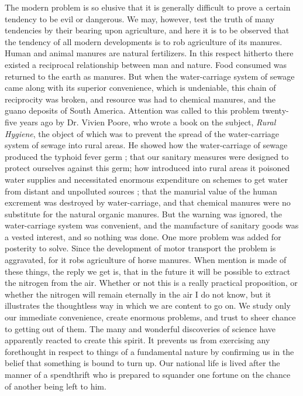 \documentclass{book}
\begin{document}
The modern problem is so elusive that it is generally difficult to prove a certain tendency to be evil or dangerous. We may, however, test the truth of many tendencies by their bearing upon agriculture, and here it is to be observed that the tendency of all modern developments is to rob agriculture of its manures. Human and animal manures are natural fertilizers. In this respect hitherto there existed a reciprocal relationship between man and nature. Food consumed was returned to the earth as manures. But when the water-carriage system of sewage came along with its superior convenience, which is undeniable, this chain of reciprocity was broken, and resource was had to chemical manures, and the guano deposits of South America. Attention was called to this problem twenty-five years ago by Dr. Vivien Poore, who wrote a book on the subject, \emph{Rural Hygiene}, the object of which was to prevent the spread of the water-carriage system of sewage into rural areas. He showed how the water-carriage of sewage produced the typhoid fever germ ; that our sanitary measures were designed to protect ourselves against this germ; how introduced into rural areas it poisoned water supplies and necessitated enormous expenditure on schemes to get water from distant and unpolluted sources ; that the manurial value of the human excrement was destroyed by water-carriage, and that chemical manures were no substitute for the natural organic manures. But the warning was ignored, the water-carriage system was convenient, and the manufacture of sanitary goods was a vested interest, and so nothing was done. One more problem was added for posterity to solve. Since the development of motor transport the problem is aggravated, for it robs agriculture of horse manures. When mention is made of these things, the reply we get is, that in the future it will be possible to extract the nitrogen from the air. Whether or not this is a really practical proposition, or whether the nitrogen will remain eternally in the air I do not know, but it illustrates the thoughtless way in which we are content to go on. We study only our immediate convenience, create enormous problems, and trust to sheer chance to getting out of them. The many and wonderful discoveries of science have apparently reacted to create this spirit. It prevents us from exercising any forethought in respect to things of a fundamental nature by confirming us in the belief that something is bound to turn up. Our national life is lived after the manner of a spendthrift who is prepared to squander one fortune on the chance of another being left to him.
\end{document}
